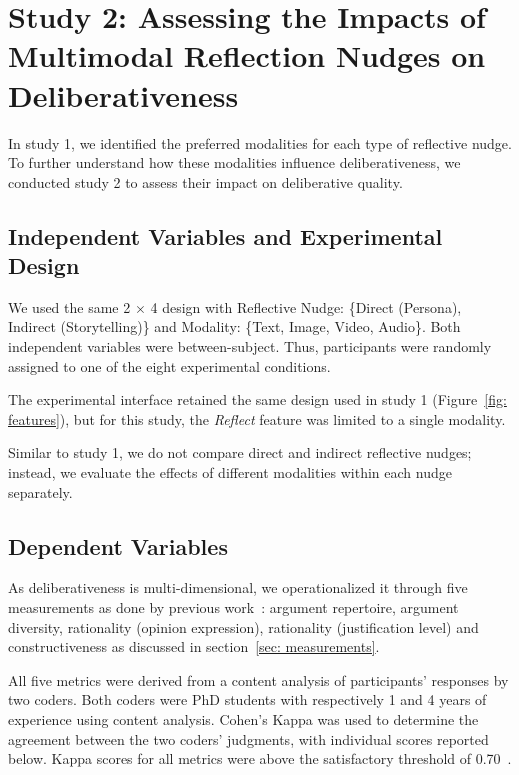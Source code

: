 \section{Study 2: Assessing the Impacts of Multimodal Reflection Nudges on Deliberativeness}
In study 1, we identified the preferred modalities for each type of reflective nudge. To further understand how these modalities influence deliberativeness, we conducted study 2 to assess their impact on deliberative quality.

\subsection{Independent Variables and Experimental Design}
We used the same 2 $\times$ 4 design with Reflective Nudge: \{Direct (Persona), Indirect (Storytelling)\} and Modality: \{Text, Image, Video, Audio\}. Both independent variables were between-subject. Thus, participants were randomly assigned to one of the eight experimental conditions. 

The experimental interface retained the same design used in study 1 (Figure~\ref{fig: features}), but for this study, the \textit{Reflect} feature was limited to a single modality. 

Similar to study 1, we do not compare direct and indirect reflective nudges; instead, we evaluate the effects of different modalities within each nudge separately.

\subsection{Dependent Variables}
As deliberativeness is multi-dimensional, we operationalized it through five measurements as done by previous work~\cite{yeo2024help}: argument repertoire, argument diversity, rationality (opinion expression), rationality (justification level) and constructiveness as discussed in section~\ref{sec: measurements}.

All five metrics were derived from a content analysis of participants' responses by two coders. Both coders were PhD students with respectively 1 and 4 years of experience using content analysis. Cohen's Kappa was used to determine the agreement between the two coders’ judgments, with individual scores reported below. Kappa scores for all metrics were above the satisfactory threshold of 0.70~\cite{viera2005understanding, mchugh2012interrater}. 

